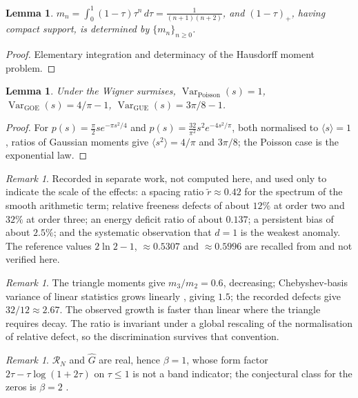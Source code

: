 \documentclass[11pt]{amsart}
\numberwithin{equation}{section}
\theoremstyle{plain}
\newtheorem{lemma}[theorem]{Lemma}
\theoremstyle{definition}
\theoremstyle{remark}
\newtheorem{remark}[theorem]{Remark}
\DeclareMathOperator{\Var}{Var}
\begin{document}
\begin{lemma}
\label{lem:triangle_moments}
$\displaystyle m_n=\int_0^1(1-\tau)\tau^n\,d\tau=\frac{1}{(n+1)(n+2)}$,
and $(1-\tau)_+$, having compact support, is determined by
$\{m_n\}_{n\ge0}$.
\end{lemma}

\begin{proof}
Elementary integration and determinacy of the Hausdorff moment problem.
\end{proof}

\begin{lemma}
\label{lem:spacing_variance_anchors}
Under the Wigner surmises,
$\Var_{\mathrm{Poisson}}(s)=1$,
$\Var_{\mathrm{GOE}}(s)=4/\pi-1$,
$\Var_{\mathrm{GUE}}(s)=3\pi/8-1$.
\end{lemma}

\begin{proof}
For $p(s)=\tfrac\pi2se^{-\pi s^2/4}$ and
$p(s)=\tfrac{32}{\pi^2}s^2e^{-4s^2/\pi}$, both normalised to
$\langle s\rangle=1$, ratios of Gaussian moments give
$\langle s^2\rangle=4/\pi$ and $3\pi/8$; the Poisson case is the
exponential law.
\end{proof}

\begin{remark}
\label{rem:empirical_inputs}
Recorded in separate work, not computed here, and used only to indicate
the scale of the effects: a spacing ratio $\tilde r\approx0.42$ for the
spectrum of the smooth arithmetic term; relative freeness defects of
about $12\%$ at order two and $32\%$ at order three; an energy deficit
ratio of about $0.137$; a persistent bias of about $2.5\%$; and the
systematic observation that $d=1$ is the weakest anomaly. The reference
values $2\ln2-1$, $\approx0.5307$ and $\approx0.5996$ are recalled
from \cite{AtasEtAl2013} and not verified here.
\end{remark}

\begin{remark}
\label{rem:defect_ratio_discrimination}
The triangle moments give $m_3/m_2=0.6$, decreasing; Chebyshev-basis
variance of linear statistics grows linearly \cite{Johansson1998},
giving $1.5$; the recorded defects give $32/12\approx2.67$. The observed
growth is faster than linear where the triangle requires decay. The
ratio is invariant under a global rescaling of the normalisation of
relative defect, so the discrimination survives that convention.
\end{remark}

\begin{remark}
\label{rem:symmetry_class_obstruction}
$\mathcal R_N$ and $\widehat G$ are real, hence $\beta=1$, whose form
factor $2\tau-\tau\log(1+2\tau)$ on $\tau\le1$ \cite{Mehta2004} is not a
band indicator; the conjectural class for the zeros is $\beta=2$
\cite{Montgomery1973, Odlyzko1987}.
\end{remark}
\end{document}
